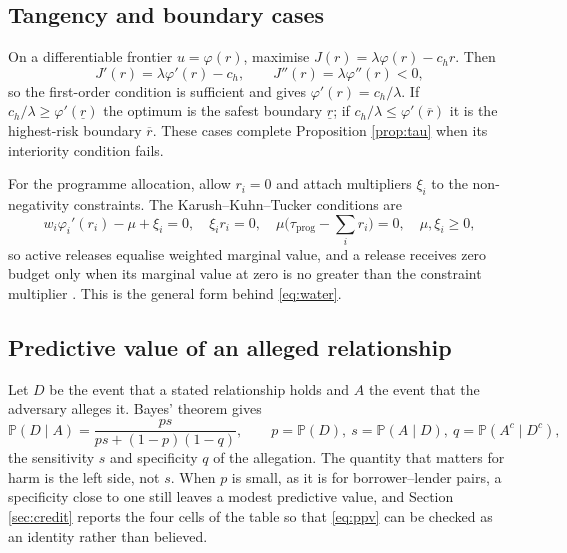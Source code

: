 \documentclass[11pt,a4paper]{article}
\theoremstyle{plain}
\theoremstyle{definition}
\newcommand{\Prob}{\mathbb{P}}
\begin{document}
\subsection{Tangency and boundary cases}

On a differentiable frontier $u=\varphi(r)$, maximise
$J(r)=\lambda\varphi(r)-c_hr$. Then
\begin{equation}
J'(r)=\lambda\varphi'(r)-c_h,\qquad
J''(r)=\lambda\varphi''(r)<0,
\end{equation}
so the first-order condition is sufficient and gives $\varphi'(r)=c_h/\lambda$.
If $c_h/\lambda\ge\varphi'(\underline r)$ the optimum is the safest boundary
$\underline r$; if $c_h/\lambda\le\varphi'(\overline r)$ it is the highest-risk
boundary $\overline r$. These cases complete Proposition \ref{prop:tau} when its
interiority condition fails.

For the programme allocation, allow $r_i=0$ and attach multipliers $\xi_i$ to the
non-negativity constraints. The Karush--Kuhn--Tucker conditions are
\begin{equation}
w_i\varphi_i'(r_i)-\mu+\xi_i=0,\quad \xi_i r_i=0,\quad
\mu\Big(\tau_{\mathrm{prog}}-\sum_i r_i\Big)=0,\quad \mu,\xi_i\ge0 ,
\end{equation}
so active releases equalise weighted marginal value, and a release receives zero
budget only when its marginal value at zero is no greater than the constraint multiplier
\citep{boyd2004}. This is the general form behind \eqref{eq:water}.

\subsection{Predictive value of an alleged relationship}

Let $D$ be the event that a stated relationship holds and $A$ the event that the
adversary alleges it. Bayes' theorem gives
\begin{equation}
\Prob(D\mid A)=\frac{p s}{p s+(1-p)(1-q)} ,
\qquad p=\Prob(D),\ s=\Prob(A\mid D),\ q=\Prob(A^c\mid D^c) ,
\label{eq:ppv}
\end{equation}
the sensitivity $s$ and specificity $q$ of the allegation. The quantity that
matters for harm is the left side, not $s$. When $p$ is small, as it is for
borrower--lender pairs, a specificity close to one still leaves a modest
predictive value, and Section \ref{sec:credit} reports the four cells of the
table so that \eqref{eq:ppv} can be checked as an identity rather than believed.
\end{document}

